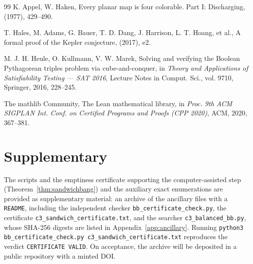 \documentclass{aims}
\numberwithin{equation}{section}
\theoremstyle{plain}
\theoremstyle{definition}
\theoremstyle{remark}
\begin{document}
\begin{thebibliography}{99}
 K. Appel, W. Haken, {Every planar map is four colorable. Part I: Discharging},   (1977), 429--490. 

 T. Hales, M. Adams, G. Bauer, T. D. Dang, J. Harrison, L. T. Hoang, et al., {A formal proof of the Kepler conjecture},   (2017), e2. 

 M. J. H. Heule, O. Kullmann, V. W. Marek, {Solving and verifying the Boolean Pythagorean triples problem via cube-and-conquer}, in {\em Theory and Applications of Satisfiability Testing --- SAT 2016}, Lecture Notes in Comput. Sci., vol. 9710, Springer, 2016, 228--245. 

 The mathlib Community, {The Lean mathematical library}, in {\em Proc. 9th ACM SIGPLAN Int. Conf. on Certified Programs and Proofs (CPP 2020)}, ACM, 2020, 367--381. 
\end{thebibliography}

\section*{Supplementary}
The scripts and the emptiness certificate supporting the computer-assisted step
(Theorem~\ref{thm:sandwichbang}) and the auxiliary exact enumerations are
provided as supplementary material: an archive of the ancillary files with a
\texttt{README}, including the independent checker
\texttt{bb\_certificate\_check.py}, the certificate
\texttt{c3\_sandwich\_certificate.txt}, and the searcher
\texttt{c3\_balanced\_bb.py}, whose SHA-256 digests are listed in
Appendix~\ref{app:ancillary}. Running \texttt{python3 bb\_certificate\_check.py
c3\_sandwich\_certificate.txt} reproduces the verdict \texttt{CERTIFICATE VALID}.
On acceptance, the archive will be deposited in a public repository with a minted
DOI.
\end{document}

